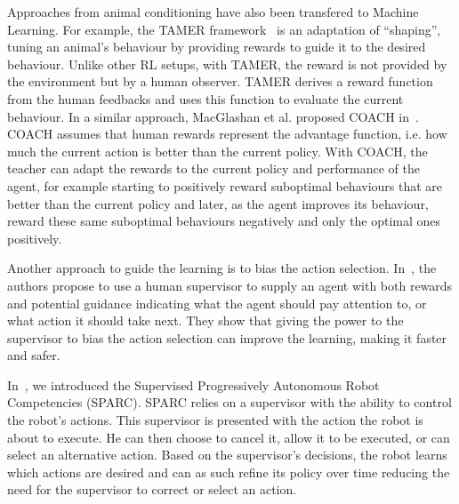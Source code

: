 \documentclass[letterpaper]{article} %
\begin{document}
Approaches from animal conditioning have also been transfered to Machine
Learning. For example, the TAMER framework~\cite{knox2009interactively} is an
adaptation of ``shaping'', tuning an animal's behaviour by providing rewards to
guide it to the desired behaviour. Unlike other RL setups, with TAMER, the
reward is not provided by the environment but by a human observer. TAMER derives
a reward function from the human feedbacks and uses this function to evaluate
the current behaviour. In a similar approach, MacGlashan et al. proposed COACH
in~\cite{macglashan2017interactive}. COACH assumes that human rewards represent
the advantage function, i.e. how much the current action is better than the
current policy. With COACH, the teacher can adapt the rewards to the current
policy and performance of the agent, for example starting to positively reward
suboptimal behaviours that are better than the current policy and later, as the
agent improves its behaviour, reward these same suboptimal behaviours negatively
and only the optimal ones positively.

Another approach to guide the learning is to bias the action selection.
In~\cite{thomaz2008teachable}, the authors propose to use a human supervisor to
supply an agent with both rewards and potential guidance indicating what the
agent should pay attention to, or what action it should take next. They show
that giving the power to the supervisor to bias the action selection can improve
the learning, making it faster and safer.

In~\cite{senft2015sparc}, we introduced the Supervised Progressively Autonomous
Robot Competencies (SPARC). SPARC relies on a supervisor with the ability to
control the robot's actions. This supervisor is presented with the action the
robot is about to execute. He can then choose to cancel it, allow it to be
executed, or can select an alternative action. Based on the supervisor's
decisions, the robot learns which actions are desired and can as such refine its
policy over time reducing the need for the supervisor to correct or select an
action.
\end{document}
